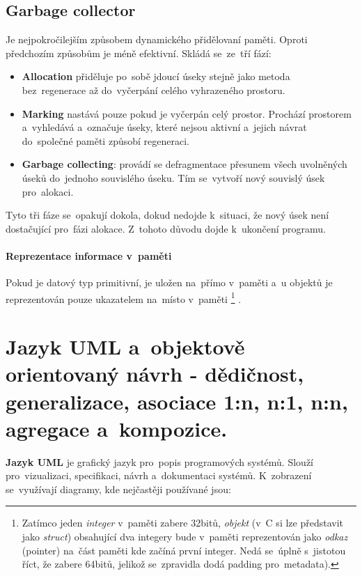 \subsection{Garbage collector}

Je nejpokročilejším způsobem dynamického přidělovaní paměti. Oproti předchozím způsobům je méně efektivní. Skládá se~ze~tří fází:

\begin{itemize}[noitemsep]
	\item \textbf{Allocation} přiděluje po~sobě jdoucí úseky stejně jako metoda bez~regenerace až do~vyčerpání celého vyhrazeného prostoru.
	\item \textbf{Marking} nastává pouze pokud je vyčerpán celý prostor. Prochází prostorem a~vyhledává a~označuje úseky, které nejsou aktivní a~jejich návrat do~společné paměti způsobí regeneraci.
	\item \textbf{Garbage collecting}: provádí se defragmentace přesunem všech uvolněných úseků do~jednoho souvislého úseku. Tím se~vytvoří nový souvislý úsek pro~alokaci.
\end{itemize}

Tyto tři fáze se~opakují dokola, dokud nedojde k~situaci, že nový úsek není dostačující pro~fázi alokace. Z~tohoto důvodu dojde k~ukončení programu.

\paragraph{Reprezentace informace v~paměti} Pokud je datový typ primitivní, je uložen na~přímo v~paměti a~u objektů je reprezentován pouze ukazatelem na~místo v~paměti%
\footnote{Zatímco jeden \textit{integer} v~paměti zabere 32bitů, \textit{objekt} (v~C si lze představit jako \textit{struct}) obsahující dva integery bude v~paměti reprezentován jako \textit{odkaz} (pointer) na~část paměti kde začíná první integer. Nedá se~úplně s~jistotou říct, že zabere 64bitů, jelikož se~zpravidla dodá padding pro~metadata).}%
.

\clearpage
\section{Jazyk UML a~objektově orientovaný návrh - dědičnost, generalizace, asociace 1:n, n:1, n:n, agregace a~kompozice.}

\textbf{Jazyk UML} je grafický jazyk pro~popis programových systémů. Slouží pro~vizualizaci, specifikaci, návrh a~dokumentaci systémů. K~zobrazení se~využívají diagramy, kde nejčastěji používané jsou:

